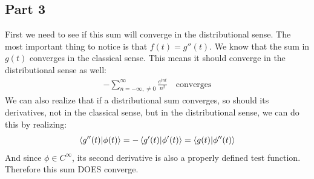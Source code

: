 \documentclass[12pt]{article}
\begin{document}
\subsection*{Part 3}
First we need to see if this sum will converge in the distributional sense. The most important thing to notice is that $f(t)=g''(t)$. We know that the sum in $g(t)$ converges in the classical sense. This means it should converge in the distributional sense as well:
\begin{align*}
  -\sum_{n=-\infty,\neq0}^\infty\frac{e^{int}}{n^2}\quad\text{converges}
\end{align*}
We can also realize that if a distributional sum converges, so should its derivatives, not in the classical sense, but in the distributional sense, we can do this by realizing:
\begin{align*}
  \ip{g''(t)}{\phi(t)}=-\ip{g'(t)}{\phi'(t)}=\ip{g(t)}{\phi''(t)}
\end{align*}
And since $\phi\in C^\infty$, its second derivative is also a properly defined test function. Therefore this sum DOES converge. 

\end{document}
